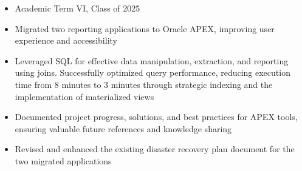 \documentclass[9.5pt,a4paper]{altacv}
\begin{document}
\tagline{ }


\begin{fullwidth}
\makecvheader
\end{fullwidth}



\begin{itemize}
\item Academic Term VI, Class of 2025
\end{itemize}



\begin{itemize}
\item Migrated two reporting applications to Oracle APEX, improving user experience and accessibility
\item Leveraged SQL for effective data manipulation, extraction, and reporting using joins. Successfully optimized query performance, reducing execution time from 8 minutes to 3 minutes through strategic indexing and the implementation of materialized views
\item Documented project progress, solutions, and best practices for APEX tools, ensuring valuable future references and knowledge sharing
\item Revised and enhanced the existing disaster recovery plan document for the two migrated applications
\end{itemize}
\end{document}
